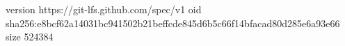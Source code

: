version https://git-lfs.github.com/spec/v1
oid sha256:e8bcf62a14031bc941502b21beffcde845d6b5c66f14bfacad80d285e6a93e66
size 524384
